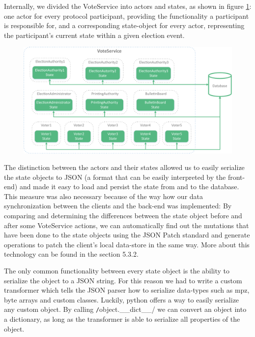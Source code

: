 Internally, we divided the VoteService into actors and states, as shown in figure \ref{VoteService}: one actor for every protocol participant, providing the functionality a participant is responsible for, and a corresponding state-object for every actor, representing the participant's current state within a given election event.

\begin{figure}[p]
\begin{center}
\includegraphics[scale=0.68]{assets/voteservice.pdf}
\label{VoteService}%
\end{center}
\end{figure}

The distinction between the actors and their states allowed us to easily serialize the state objects to JSON (a format that can be easily interpreted by the front-end) and made it easy to load and persist the state from and to the database. This measure was also necessary because of the way how our data synchronization between the clients and the back-end was implemented: By comparing and determining the differences between the state object before and after some VoteService actions, we can automatically find out the mutations that have been done to the state objects using the JSON Patch standard and generate operations to patch the client's local data-store in the same way. More about this technology can be found in the section 5.3.2.

The only common functionality between every state object is the ability to serialize the object to a JSON string. For this reason we had to write a custom transformer which tells the JSON parser how to serialize data-types such as mpz, byte arrays and custom classes. Luckily, python offers a way to easily serialize any custom object. By calling \texttt/object.__dict__/ we can convert an object into a dictionary, as long as the transformer is able to serialize all properties of the object.


